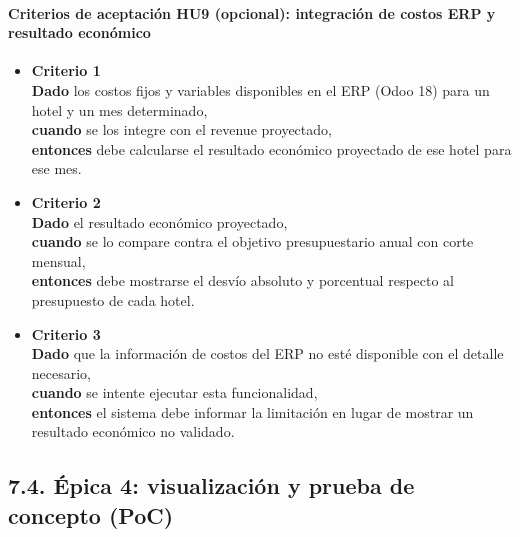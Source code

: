 \documentclass[
11pt, %
]{charter}
\begin{document}
\paragraph{Criterios de aceptación HU9 (opcional): integración de costos ERP y resultado económico}
\begin{itemize}
  \item \textbf{Criterio 1} \\
  \textbf{Dado} los costos fijos y variables disponibles en el ERP (Odoo 18) para un hotel y un mes determinado, \\
  \textbf{cuando} se los integre con el revenue proyectado, \\
  \textbf{entonces} debe calcularse el resultado económico proyectado de ese hotel para ese mes.

  \item \textbf{Criterio 2} \\
  \textbf{Dado} el resultado económico proyectado, \\
  \textbf{cuando} se lo compare contra el objetivo presupuestario anual con corte mensual, \\
  \textbf{entonces} debe mostrarse el desvío absoluto y porcentual respecto al presupuesto de cada hotel.

  \item \textbf{Criterio 3} \\
  \textbf{Dado} que la información de costos del ERP no esté disponible con el detalle necesario, \\
  \textbf{cuando} se intente ejecutar esta funcionalidad, \\
  \textbf{entonces} el sistema debe informar la limitación en lugar de mostrar un resultado económico no validado.
\end{itemize}

\subsection*{7.4. Épica 4: visualización y prueba de concepto (PoC)}
\end{document}
